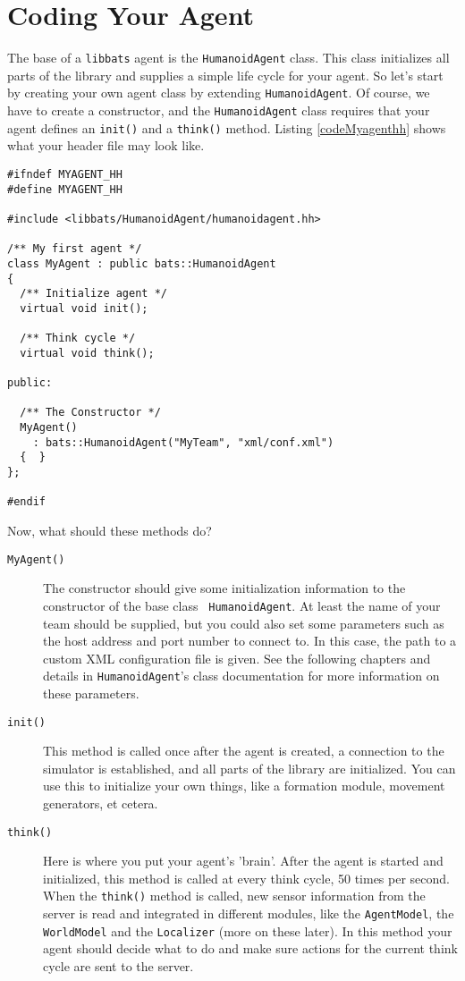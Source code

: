 \newpage
\section{Coding Your Agent}
\label{sec:coding-your-agent}

The base of a {\tt libbats} agent is the {\tt HumanoidAgent}
class. This class initializes all parts of the library and supplies a
simple life cycle for your agent. So let's start by creating your own
agent class by extending {\tt HumanoidAgent}. Of course, we have to
create a constructor, and the {\tt HumanoidAgent} class requires that
your agent defines an {\tt init()} and a {\tt think()} method. Listing
\ref{codeMyagenthh} shows what your header file may look like.

\begin{lstlisting}[float,caption={\tt myagent.hh},label=codeMyagenthh,frame=single]
#ifndef MYAGENT_HH
#define MYAGENT_HH

#include <libbats/HumanoidAgent/humanoidagent.hh>

/** My first agent */
class MyAgent : public bats::HumanoidAgent
{
  /** Initialize agent */
  virtual void init();
  
  /** Think cycle */
  virtual void think();
  
public:

  /** The Constructor */
  MyAgent()
    : bats::HumanoidAgent("MyTeam", "xml/conf.xml")
  {  }
};

#endif
\end{lstlisting}

Now, what should these methods do?
\begin{description}
\item[{\tt MyAgent()}] The constructor should give some initialization
  information to the constructor of the base class {\tt
    HumanoidAgent}. At least the name of your team should be supplied,
  but you could also set some parameters such as the host address and
  port number to connect to. In this case, the path to a custom XML
  configuration file is given. See the following chapters and details
  in {\tt HumanoidAgent}'s class documentation for more information on
  these parameters.
\item[{\tt init()}] This method is called once after the agent is
  created, a connection to the simulator is established, and all parts
  of the library are initialized. You can use this to initialize your
  own things, like a formation module, movement generators, et cetera.
\item[{\tt think()}] Here is where you put your agent's 'brain'. After
  the agent is started and initialized, this method is called at every
  think cycle, 50 times per second. When the {\tt think()} method is
  called, new sensor information from the server is read and
  integrated in different modules, like the {\tt AgentModel}, the {\tt
    WorldModel} and the {\tt Localizer} (more on these later). In this
  method your agent should decide what to do and make sure actions for
  the current think cycle are sent to the server.
\end{description}

